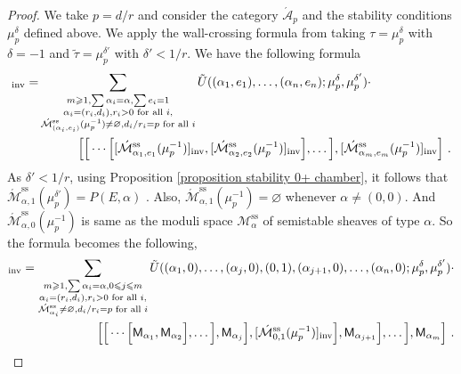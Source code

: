 \documentclass[11pt]{amsart}
\theoremstyle{remark}
\newcommand{\Adash}{\acute{\mathcal{A}}}
\newcommand{\M}{\mathcal{M}}
\newcommand{\Mdash}{\acute{\mathcal{M}}}
\newcommand{\inv}[0]{\textnormal{inv}}
\newcommand{\sfM}{\mathsf M}
\renewcommand{\ss}[0]{\text{ss}}
\numberwithin{theorem}{section}
\begin{document}
    \begin{proof}
        We take $p=d/r$ and consider the category $\Adash_p$ and the stability conditions $\mu_p^\delta$ defined above.
        We apply the wall-crossing formula from \cite[Theorem 5.9]{Joy21} taking $\tau = \mu_p^\delta$ with $\delta =-1$ and $\tilde{\tau} = \mu_p^{\delta'}$ with $\delta'<1/r$.
        We have the following formula
        \begin{align*}
        [\Mdash^{\ss}_{\alpha,1}(\mu_p^{\delta'})]_\inv =
        &\sum_{\substack{m \geqslant 1, \sum \alpha_i = \alpha,
                \sum e_i = 1 \\ 
                \alpha_i=(r_i,d_i), r_i>0 \text{ for all }i,\\
                \Mdash^{\ss}_{(\alpha_i,e_i)}(\mu_p^{-1}) \neq \varnothing,  d_i/r_i= p \text{ for all }i
                }}
                \tilde U((\alpha_1,e_1),\dots,(\alpha_n,e_n);\mu_p^{\delta},\mu_p^{\delta'}) \cdot \\   
        & \qquad \quad \left[\Big[ \cdots \Big[ [\Mdash^{\ss}_{\alpha_1,e_1}(\mu_p^{-1})]_\inv, [\Mdash^{\ss}_{\alpha_2,e_2}(\mu_p^{-1})]_\inv \Big],\dots \Big],[\Mdash^{\ss}_{\alpha_m,e_m}(\mu_p^{-1})]_\inv\right] \,.
    \end{align*}
        As $\delta' <1/r$, using Proposition \ref{proposition stability 0+ chamber},
        it follows that
        $\Mdash^{\ss}_{\alpha,1}(\mu_p^{\delta'})= P(E,\alpha)$ .
        Also, $\Mdash^{\ss}_{\alpha,1}(\mu_p^{-1}) = \varnothing$ whenever $\alpha \neq (0,0)$.
        And $\Mdash^{\ss}_{\alpha,0}(\mu_p^{-1})$ is same as the moduli space $\M^{\ss}_\alpha$ of semistable sheaves of type $\alpha$.
        So the formula becomes the following,
        \begin{align*}
        [P(E,\alpha)]_\inv =
        \sum_{\substack{m \geqslant 1, \sum \alpha_i = \alpha, 
                0 \leqslant j \leqslant m\\ 
                \alpha_i=(r_i,d_i), r_i>0 \text{ for all }i,\\
                \Mdash^{\ss}_{\alpha_i} \neq \varnothing,  d_i/r_i= p \text{ for all }i}}
                \tilde U((\alpha_1,0),\dots,(\alpha_j,0),(0,1),(\alpha_{j+1},0),\dots, (\alpha_n,0); \mu_p^{\delta},\mu_p^{\delta'}) \cdot & \\      
         \left[ \Big[ \cdots \Big[ 
        \sfM_{\alpha_1}, \sfM_{\alpha_2} \Big],\dots \Big],
        \sfM_{\alpha_j} \Big], [\Mdash^{\ss}_{0,1}(\mu_p^{-1})]_\inv \Big],\sfM_{\alpha_{j+1}} \Big],
        \dots \Big],\sfM_{\alpha_m} \right]\,.&

\end{align*}
\end{proof}
\end{document}
